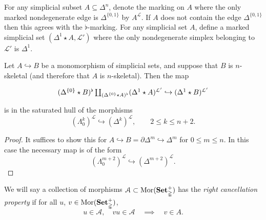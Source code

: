 \documentclass[main.tex]{subfiles}
\begin{document}
For any simplicial subset $A \subseteq \Delta^{n}$, denote the marking on $A$ where the only marked nondegenerate edge is $\Delta^{\{0, 1\}}$ by $A^{\mathcal{L}}$. If $A$ does not contain the edge $\Delta^{\{0, 1\}}$ then this agrees with the $\flat$-marking. For any simplicial set $A$, define a marked simplicial set $(\Delta^{1} \star A, \mathcal{L'})$ where the only nondegenerate simplex belonging to $\mathcal{L'}$ is $\Delta^{1}$.

\begin{lemma}
  \label{lemma:starred_smash_with_mono}
  Let $A \hookrightarrow B$ be a monomorphism of simplicial sets, and suppose that $B$ is $n$-skeletal (and therefore that $A$ is $n$-skeletal). Then the map
  \begin{equation*}
    \begin{tikzcd}
      (\Delta^{\{0\}} \star B)^{\flat} \coprod_{(\Delta^{\{0\}} \star A)^{\flat}} (\Delta^{1} \star A)^{\mathcal{L}'} \hookrightarrow (\Delta^{1} \star B)^{\mathcal{L}'}
    \end{tikzcd}
  \end{equation*}
  is in the saturated hull of the morphisms
  \begin{equation*}
    (\Lambda^{k}_{0})^{\mathcal{L}} \hookrightarrow (\Delta^{k})^{\mathcal{L}},\qquad 2 \leq k \leq n+2.
  \end{equation*}
\end{lemma}
\begin{proof}
  It suffices to show this for $A \hookrightarrow B = \partial \Delta^{m} \hookrightarrow \Delta^{m}$ for $0 \leq m \leq n$. In this case the necessary map is of the form
  \begin{equation*}
    (\Lambda^{m+2}_{0})^{\mathcal{L}} \hookrightarrow (\Delta^{m+2})^{\mathcal{L}}.
  \end{equation*}
\end{proof}

We will say a collection of morphisms $\mathcal{A} \subset \mathrm{Mor}(\mathbf{Set}_{\mathbb{\Delta}}^{+})$ has the \emph{right cancellation property} if for all $u$, $v \in \mathrm{Mor}(\mathbf{Set}_{\mathbb{\Delta}}^{+})$,
\begin{equation*}
  u \in \mathcal{A},\quad vu \in \mathcal{A} \quad \implies \quad v \in A.
\end{equation*}
\end{document}
